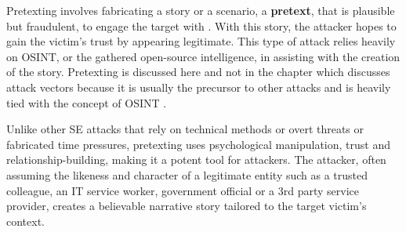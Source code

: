 Pretexting involves fabricating a story or a scenario, a \textbf{pretext}, that is plausible but fraudulent, to engage the target  with \citep{contehCybersecurityRisksVulnerabilities2016}. With this story, the attacker hopes to gain the victim's trust by appearing legitimate. This type of attack relies heavily on OSINT, or the gathered open-source intelligence, in assisting with the creation of the story. Pretexting is discussed here and not in the chapter which discusses attack vectors because it is usually the precursor to other attacks and is heavily tied with the concept of OSINT \citep{hadnagySocialEngineering2018}.

Unlike other SE attacks that rely on technical methods or overt threats or  fabricated time pressures, pretexting uses psychological manipulation, trust and relationship-building, making it a potent tool for attackers. The attacker, often assuming the likeness and character of a legitimate entity such as a trusted colleague, an IT service worker, government official or a 3rd party service provider, creates a believable narrative story tailored to the target victim's context.



